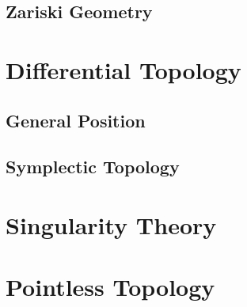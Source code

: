 \subsection{Zariski Geometry}\label{sec:zariski_geometry}



\section{Differential Topology}\label{sec:differential_topology}

\subsection{General Position}\label{sec:general_position}

\subsection{Symplectic Topology}\label{sec:symplectic_topology}



\section{Singularity Theory}\label{sec:singularity_theory}

\section{Pointless Topology}\label{sec:pointless_topology}
